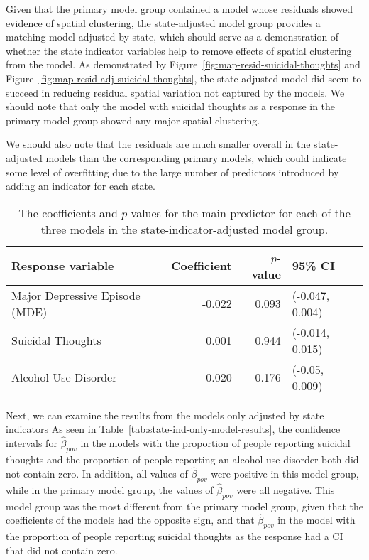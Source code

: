 \documentclass{article}
\begin{document}
Given that the primary model group contained
a model whose residuals showed evidence of spatial clustering,
the state-adjusted model group provides a matching
model adjusted by state,
which should serve as a demonstration of whether
the state indicator variables help to remove
effects of spatial clustering from the model.
As demonstrated by
Figure~\ref{fig:map-resid-suicidal-thoughts}
and Figure~\ref{fig:map-resid-adj-suicidal-thoughts},
the state-adjusted model did seem to succeed in
reducing residual spatial variation
not captured by the models.
We should note that only the model with suicidal
thoughts as a response in the primary model group
showed any major spatial clustering.

We should also note that the residuals
are much smaller overall in the state-adjusted
models than the corresponding primary models,
which could indicate some level of overfitting due
to the large number of predictors
introduced by adding an indicator for each state.


\begin{table}[t]
\begin{center}
\begin{tabular}{l r r l}
    \toprule
    Response variable & Coefficient & $p$-value & 95\% CI\\
    \midrule
    Major Depressive Episode (MDE) & -0.022 & 0.093 & (-0.047, 0.004)\\
    Suicidal Thoughts & 0.001 & 0.944 & (-0.014, 0.015)\\
    Alcohol Use Disorder & -0.020 & 0.176 & (-0.05, 0.009)\\
    \bottomrule
\end{tabular}
\caption{\label{tab:state-ind-model-results} The coefficients and $p$-values
    for the main predictor for each of the three models
    in the state-indicator-adjusted model group.
}
\end{center}
\end{table}

Next, we can examine the results
from the models only adjusted by state indicators
As seen in Table~\ref{tab:state-ind-only-model-results},
the confidence intervals for $\hat{\beta}_{pov}$
in the models with the proportion of people
reporting suicidal thoughts
and the proportion of people reporting an alcohol use disorder
both did not contain zero.
In addition, all values of $\hat{\beta}_{pov}$
were positive in this model group,
while in the primary model group,
the values of $\hat{\beta}_{pov}$
were all negative.
This model group was the most different from the primary model group,
given that the coefficients of the models had the opposite sign,
and that $\hat{\beta}_{pov}$ in the model
with the proportion of people reporting suicidal thoughts
as the response had a CI that did not contain zero.
\end{document}
